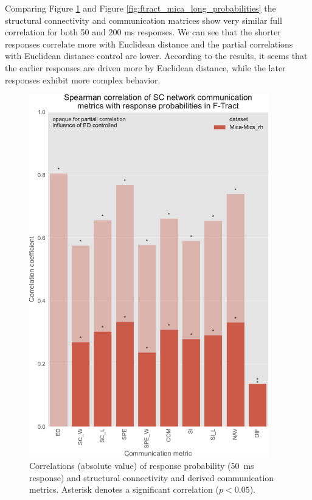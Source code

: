Comparing Figure \ref{fig:ftract_mica_short_probabilities} and Figure \ref{fig:ftract_mica_long_probabilities} the structural connectivity and communication matrices show very similar full correlation for both 50 and 200 ms responses. We can see that the shorter responses correlate more with Euclidean distance and the partial correlations with Euclidean distance control are lower. According to the results, it seems that the earlier responses are driven more by Euclidean distance, while the later responses exhibit more complex behavior. 

\begin{figure}
    \centering
    \includegraphics[width=0.93\textwidth]{images/nootebook_generated/ftract_results/MNI-HCP-MMP1/5/ED0/0.25/short/mica_rhSpearman_correlation_of_SC_network_communication_metrics_with_response_probabilities_in_F-Tract.pdf}
    \caption[F-Tract probability correlations - Mica-Mics\_rh 50 ms]{Correlations (absolute value) of response probability (50~ms response) and structural connectivity and derived communication metrics. Asterisk denotes a significant correlation ($p<0.05$).}
    \label{fig:ftract_mica_short_probabilities}
\end{figure}

